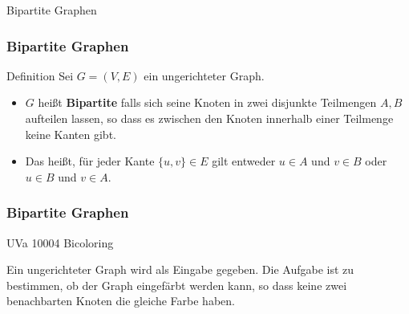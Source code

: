 \begin{frame}
	\Huge Bipartite Graphen
\end{frame}

\begin{frame}
	\frametitle{Bipartite Graphen}
	\begin{KITinfoblock}{Definition}
		Sei $G = (V,E)$ ein ungerichteter Graph.
	\begin{itemize}
		\item  $G$ heißt \textbf{Bipartite} falls sich seine Knoten in zwei disjunkte Teilmengen $A, B$ aufteilen lassen, so dass es zwischen den Knoten innerhalb einer Teilmenge keine Kanten gibt.
		\item  Das heißt, für jeder Kante $\{u,v\} \in E$ gilt entweder $u \in A$ und $v \in B$ oder $u \in B$ und $v \in A$.
	\end{itemize}
	\end{KITinfoblock}
\end{frame}

\begin{frame}
	\frametitle{Bipartite Graphen}
	\begin{KITexampleblock}{UVa 10004 Bicoloring}
		
		  	
		Ein ungerichteter Graph wird als Eingabe gegeben. Die Aufgabe ist zu bestimmen, ob der Graph eingefärbt werden kann, so dass keine zwei benachbarten Knoten die gleiche Farbe haben.
		 
		  
	\end{KITexampleblock}
\end{frame}



